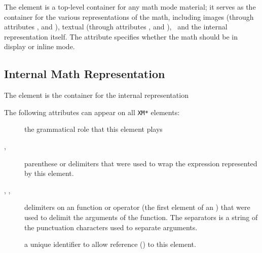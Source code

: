 \documentclass{report}
\begin{document}
The  element is a top-level container for any math mode material; it
serves as the container for the various representations of the math, including
images (through attributes ,  and ), 
textual (through attributes ,  and ),
\MathML\ and the internal representation itself.  
The  attribute specifies whether the math should be in display or inline mode.

\subsection{Internal Math Representation}\label{math.details.representation}
The  element is the container for the internal representation

The following attributes can appear on all \texttt{XM*} elements:
\begin{description}
\item[] the grammatical role that this element plays 
\item[, ] parenthese or delimiters that were used to wrap the
   expression represented by this element.
\item[, , ] delimiters on an function or operator
   (the first element of an )  that were used to delimit the arguments of the function.
    The separators is a string of the punctuation characters used to separate arguments.
\item[] a unique identifier to allow reference () to this element.
\end{description}
\end{document}
